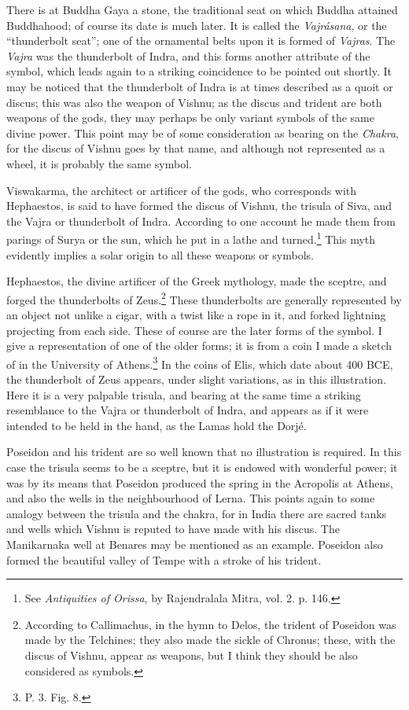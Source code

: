 \documentclass[a4paper, 11pt, oneside, english]{article}
\begin{document}
There is at Buddha Gaya a stone, the traditional seat on which Buddha attained Buddhahood; of course its date is much later. It is called the \emph{Vajrásana}, or the ``thunderbolt seat''; one of the ornamental belts upon it is formed of \emph{Vajras}. The \emph{Vajra} was the thunderbolt of Indra, and this forms another attribute of the symbol, which leads again to a striking coincidence to be pointed out shortly. It may be noticed that the thunderbolt of Indra is at times described as a quoit or discus; this was also the weapon of Vishnu; as the discus and trident are both weapons of the gods, they may perhaps be only variant symbols of the same divine power. This point may be of some consideration as bearing on the \emph{Chakra}, for the discus of Vishnu goes by that name, and although not represented as a wheel, it is probably the same symbol.

Viswakarma, the architect or artificer of the gods, who corresponds with Hephaestos, is said to have formed the discus of Vishnu, the trisula of Siva, and the Vajra or thunderbolt of Indra. According to one account he made them from parings of Surya or the sun, which he put in a lathe and turned.\footnote{See \emph{Antiquities of Orissa}, by Rajendralala Mitra, vol. 2. p. 146.} This myth evidently implies a solar origin to all these weapons or symbols.

Hephaestos, the divine artificer of the Greek mythology, made the sceptre, and forged the thunderbolts of Zeus.\footnote{According to Callimachus, in the hymn to Delos, the trident of Poseidon was made by the Telchines; they also made the sickle of Chronus; these, with the discus of Vishnu, appear as weapons, but I think they should be also considered as symbols.} These thunderbolts are generally represented by an object not unlike a cigar, with a twist like a rope in it, and forked lightning projecting from each side. These of course are the later forms of the symbol. I give a representation of one of the older forms; it is from a coin I made a sketch of in the University of Athens.\footnote{P. 3. Fig. 8.} In the coins of Elis, which date about 400 BCE, the thunderbolt of Zeus appears, under slight variations, as in this illustration. Here it is a very palpable trisula, and bearing at the same time a striking resemblance to the Vajra or thunderbolt of Indra, and appears as if it were intended to be held in the hand, as the Lamas hold the Dorjé.

Poseidon and his trident are so well known that no illustration is required. In this case the trisula seems to be a sceptre, but it is endowed with wonderful power; it was by its means that Poseidon produced the spring in the Acropolis at Athens, and also the wells in the neighbourhood of Lerna. This points again to some analogy between the trisula and the chakra, for in India there are sacred tanks and wells which Vishnu is reputed to have made with his discus. The Manikarnaka well at Benares may be mentioned as an example. Poseidon also formed the beautiful valley of Tempe with a stroke of his trident.
\end{document}
